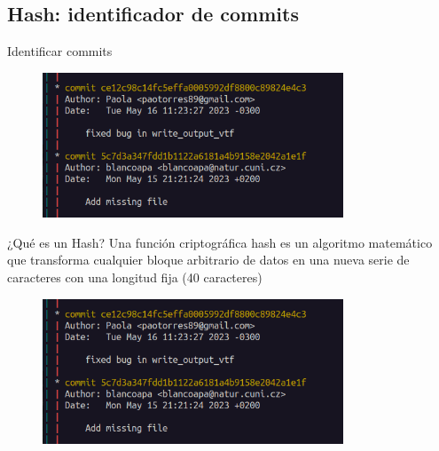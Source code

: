 \documentclass{beamer}
\begin{document}
\subsection{Hash: identificador de commits}

\begin{frame}{Identificar commits}
  
  \begin{figure}
    \includegraphics[width=0.8\textwidth]{images/git-hash.png}
  \end{figure}

   {\begin{alertblock}{¿Qué es un Hash?}
    Una función criptográfica hash es un algoritmo matemático que transforma cualquier bloque arbitrario de datos en una nueva serie de caracteres con una longitud fija (40 caracteres)
    \end{alertblock}  }

\end{frame}

\begin{frame}

  \begin{figure}
    \includegraphics[width=0.8\textwidth]{images/git-hash.png}
  \end{figure}



\end{frame}
\end{document}
